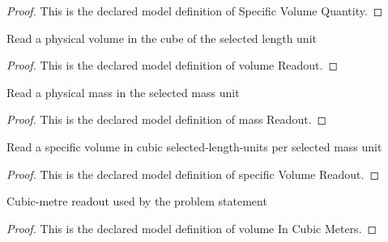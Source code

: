 \begin{proof}
  This is the declared model definition of Specific Volume Quantity.
\end{proof}
\begin{definition}
  \label{def:physics:phyx-mini-0439:phyxminiproblems-problemphyxmini0439-volumereadout}
  Read a physical volume in the cube of the selected length unit
\end{definition}
\begin{proof}
  This is the declared model definition of volume Readout.
\end{proof}
\begin{definition}
  \label{def:physics:phyx-mini-0439:phyxminiproblems-problemphyxmini0439-massreadout}
  Read a physical mass in the selected mass unit
\end{definition}
\begin{proof}
  This is the declared model definition of mass Readout.
\end{proof}
\begin{definition}
  \label{def:physics:phyx-mini-0439:phyxminiproblems-problemphyxmini0439-specificvolumereadout}
  Read a specific volume in cubic selected-length-units per selected mass unit
\end{definition}
\begin{proof}
  This is the declared model definition of specific Volume Readout.
\end{proof}
\begin{definition}
  \label{def:physics:phyx-mini-0439:phyxminiproblems-problemphyxmini0439-volumeincubicmeters}
  Cubic-metre readout used by the problem statement
\end{definition}
\begin{proof}
  This is the declared model definition of volume In Cubic Meters.
\end{proof}
